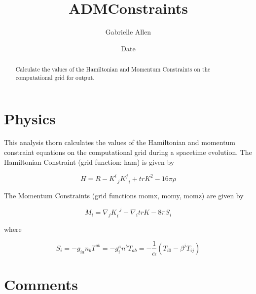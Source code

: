 \documentclass{article}
\begin{document}
\title{ADMConstraints}
\author{Gabrielle Allen}
\date{$ $Date$ $}

\maketitle


\begin{abstract}
Calculate the values of the Hamiltonian and Momentum Constraints on the computational grid for output.
\end{abstract}

\section{Physics}

This analysis thorn calculates the values of the Hamiltonian and
momentum constraint equations on the computational grid during a spacetime
evolution. The Hamiltonian Constraint (grid function: ham) is given by

\begin{equation}
 H = R - K^{i}_{\;\;j} K^{j}_{\;\;i} + trK^2 - 16 \pi \rho
\end{equation}

The Momentum Constraints  (grid functions momx, momy, momz) are given by

\begin{equation}
M_i = \nabla_j K_i^{\;\;j} - \nabla_i trK - 8 \pi S_i
\end{equation}

where

\begin{equation}
S_i = -g_{ia} n_b T^{ab} = - g_i^a n^b T_{ab} = -\frac{1}{\alpha} (T_{i0} - \beta^j T_{ij})
\end{equation}

\section{Comments}
\end{document}
